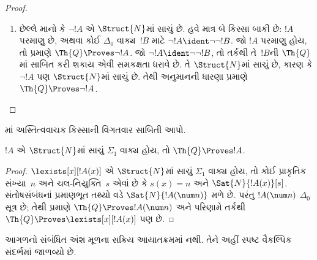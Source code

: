 \begin{proof}
\begin{enumerate}
મર્યાદિત સર્વવાચક પરિમાણકની
દલીલ વાપરી શકીએ.
\item છેલ્લે માનો કે
$\lnot !A$ એ $\Struct{N}$માં
સાચું છે. હવે માત્ર બે
કિસ્સા બાકી છે: $!A$
પરમાણુ છે, અથવા કોઈ
$\Delta_0$ વાક્ય~$!B$
માટે
$\lnot !A \ident \lnot\lnot !B$.
જો $!A$ પરમાણુ હોય, તો
પ્રમાણે $\Th{Q} \Proves
\lnot !A$. જો
$\lnot !A \ident \lnot\lnot !B$,
તો તર્કથી તે~$!B$ની
$\Th{Q}$માં સાબિત કરી શકાય
એવી સમકક્ષતા ધરાવે છે.
તે $\Struct{N}$માં સાચું છે,
કારણ કે $\lnot !A$ પણ
$\Struct{N}$માં સાચું છે.
તેથી અનુમાનની ધારણા પ્રમાણે
$\Th{Q} \Proves \lnot !A$.
\end{enumerate}
\end{proof}

\begin{prob}
માં
અસ્તિત્વવાચક કિસ્સાની વિગતવાર
સાબિતી આપો.
\end{prob}

\begin{thm}
$!A$ એ $\Struct{N}$માં સાચું
$\Sigma_1$ વાક્ય હોય,
તો $\Th{Q} \Proves !A$.
\end{thm}

\begin{proof}
$\lexists[x][!A(x)]$ એ
$\Struct{N}$માં સાચું
$\Sigma_1$ વાક્ય
હોય, તો કોઈ પ્રાકૃતિક
સંખ્યા~$n$ અને ચલ-નિયુક્તિ~$s$
એવાં છે કે $s(x) = n$ અને
$\Sat{N}{!A(x)}[s]$.
સંતોષસંબંધનાં પ્રમાણભૂત
તથ્યો વડે $\Sat{N}{!A(\num n)}$
મળે છે. પરંતુ $!A(\num n)$
$\Delta_0$ સૂત્ર છે;
તેથી 
પ્રમાણે $\Th{Q} \Proves
!A(\num n)$ અને પરિણામે
તર્કથી $\Th{Q} \Proves
\lexists[x][!A(x)]$ પણ છે.
\end{proof}
\endgroup


\OLEndChapterHook


\begin{editorial}
આગળનો સંબંધિત અંશ મૂળના સક્રિય આયાતક્રમમાં નથી. તેને અહીં સ્પષ્ટ વૈકલ્પિક સંદર્ભમાં જાળવ્યો છે.
\end{editorial}
\begingroup
\makeatletter{}\makeatother

\label{guunit:OLP-0647}


